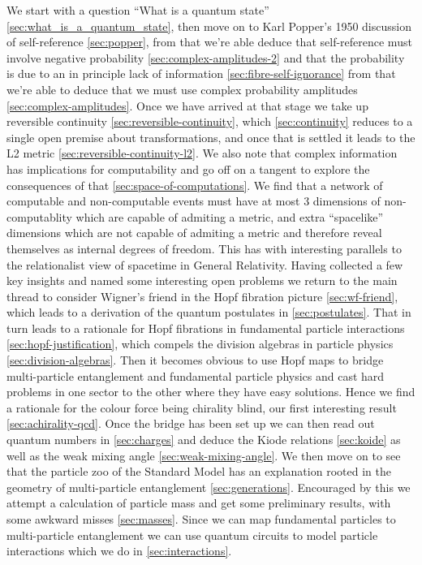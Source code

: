 \documentclass{article}
\theoremstyle{plain}
\theoremstyle{definition}
\theoremstyle{remark}\newtheorem*{remark}{Remark}
\begin{document}
We start with a question \enquote{What is a quantum state} \ref{sec:what_is_a_quantum_state},
then move on to Karl Popper's 1950 discussion of self-reference \ref{sec:popper}, from that
we're able deduce that self-reference must involve negative probability
\ref{sec:complex-amplitudes-2} and that the probability is due to an in principle lack of
information \ref{sec:fibre-self-ignorance} from that we're able to deduce that we must use complex
probability amplitudes \ref{sec:complex-amplitudes}. Once we have arrived at that stage we take up reversible continuity
\ref{sec:reversible-continuity}, which \ref{sec:continuity} reduces to a single open premise about transformations, and once that
is settled it leads to the L2 metric
\ref{sec:reversible-continuity-l2}. We also note that complex information
has implications for computability and go off on a tangent to explore the consequences of that
\ref{sec:space-of-computations}. We find that a network of computable and non-computable events
must have at most 3 dimensions of non-computablity which are capable of admiting a metric, and
extra \enquote{spacelike} dimensions which are not capable of admiting a metric and therefore
reveal themselves as internal degrees of freedom. This has with interesting parallels to the
relationalist view of spacetime in General Relativity. Having collected a few key insights and
named some interesting open problems we return to the main thread to consider Wigner's friend in
the Hopf fibration picture \ref{sec:wf-friend}, which leads to a derivation of the quantum
postulates in \ref{sec:postulates}. That in turn leads to a rationale for Hopf fibrations in
fundamental particle interactions \ref{sec:hopf-justification}, which compels the division
algebras in particle physics \ref{sec:division-algebras}. Then it becomes obvious to use Hopf maps to
bridge multi-particle entanglement and fundamental particle physics and cast hard problems in
one sector to the other where they have easy solutions. Hence we find a rationale for the colour
force being chirality blind, our first interesting result \ref{sec:achirality-qcd}. Once the
bridge has been set up we can then read out quantum numbers in \ref{sec:charges} and
deduce the Kiode relations \ref{sec:koide} as well as the weak mixing angle
\ref{sec:weak-mixing-angle}. We then move on to see that the particle zoo of the Standard Model
has an explanation rooted in the geometry of multi-particle entanglement \ref{sec:generations}.
Encouraged by this we attempt a calculation of particle mass and get some preliminary results,
with some awkward misses \ref{sec:masses}. Since we can map fundamental particles to
multi-particle entanglement we can use quantum circuits to model particle interactions which we
do in \ref{sec:interactions}.
\end{document}
